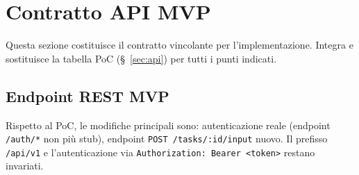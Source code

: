 \documentclass[11pt,a4paper]{article}
\begin{document}
\section{Contratto API MVP}
\label{sec:be-contratto-api}

Questa sezione costituisce il contratto vincolante per l'implementazione. Integra e sostituisce la tabella PoC (\S~\ref{sec:api}) per tutti i punti indicati.

\subsection{Endpoint REST MVP}

Rispetto al PoC, le modifiche principali sono: autenticazione reale (endpoint \texttt{/auth/*} non più stub), endpoint \texttt{POST /tasks/:id/input} nuovo. Il prefisso \texttt{/api/v1} e l'autenticazione via \texttt{Authorization: Bearer <token>} restano invariati.
\end{document}
